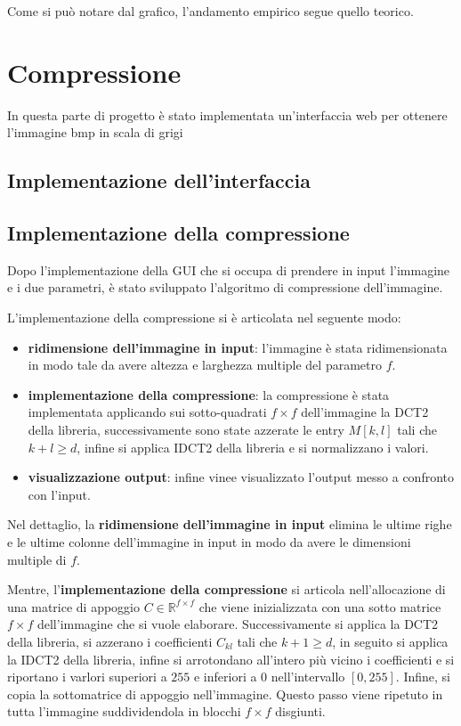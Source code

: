 Come si può notare dal grafico, l'andamento empirico segue quello teorico.

\section{Compressione}
In questa parte di progetto è stato implementata un'interfaccia web per ottenere
l'immagine bmp in scala di grigi

\subsection{Implementazione dell'interfaccia}

\subsection{Implementazione della compressione}
Dopo l'implementazione della GUI che si occupa di prendere in input l'immagine e
i due parametri, è stato sviluppato l'algoritmo di compressione dell'immagine.

L'implementazione della compressione si è articolata nel seguente modo:
\begin{itemize}
    \item \textbf{ridimensione dell'immagine in input}: l'immagine è stata ridimensionata
          in modo tale da avere altezza e larghezza multiple del parametro $f$.
    \item \textbf{implementazione della compressione}: la compressione è stata implementata
          applicando sui sotto-quadrati $f\times f$ dell'immagine la DCT2 della libreria,
          successivamente sono state azzerate le entry $M[k,l]$ tali che $k+l\ge d$, infine
          si applica IDCT2 della libreria e si normalizzano i valori.
    \item \textbf{visualizzazione output}: infine vinee visualizzato l'output
          messo a confronto con l'input.
\end{itemize}

Nel dettaglio, la \textbf{ridimensione dell'immagine in input} elimina le ultime
righe e le ultime colonne dell'immagine in input in modo da avere le dimensioni
multiple di $f$.

Mentre, l'\textbf{implementazione della compressione} si articola nell'allocazione
di una matrice di appoggio $C\in \mathbb{R}^{f\times f}$ che viene inizializzata
con una sotto matrice $f\times f$ dell'immagine che si vuole elaborare. Successivamente
si applica la DCT2 della libreria, si azzerano i coefficienti $C_{kl}$ tali che 
$k+1\ge d$, in seguito si applica la IDCT2 della libreria, infine si arrotondano 
all'intero più vicino i coefficienti e si riportano i varlori superiori a $255$ 
e inferiori a $0$ nell'intervallo $[0,255]$. Infine, si copia la sottomatrice di 
appoggio nell'immagine. Questo passo viene ripetuto in tutta l'immagine suddividendola 
in blocchi $f\times f$ disgiunti.
